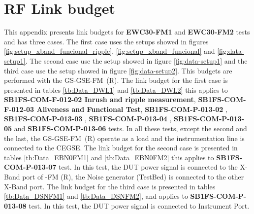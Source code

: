 \section{RF Link budget} \label{an:rf-link-budget}
\newcommand{\cod}{SB1FS-COM-}

 

This appendix presents link budgets for \textbf{EWC30-FM1} and \textbf{EWC30-FM2} 
tests and has three cases.
The first case uses the setups showed in figures \ref{fig:setup_xband_funcional_ripple}, \ref{fig:setup_xband_funcional} and \ref{fig:data-setup1}.
The second case use the setup showed in figure \ref{fig:data-setup1} and 
the third case use the setup showed in figure \ref{fig:data-setup2}. This budgets are performed with the 
GS-GSE-FM~(R). The link budget for the first case is presented in tables \ref{tb:Data_DWL1} and 
\ref{tb:Data_DWL2} this applies to \textbf{\cod{F-012-02} Inrush and ripple measurement}, \textbf{\cod{F-012-03} Aliveness and Functional Test}, 
\textbf{\cod{P-013-02} \TestPerfRFPXA}, \textbf{\cod{P-013-03} \TestPerfCCDF}, 
\textbf{\cod{P-013-04} \TestPerfFreqS}, \textbf{\cod{P-013-05} \TestPerfCWPhaseN} and 
\textbf{\cod{P-013-06} \TestPerfFilterVector} tests. In all these tests, except the second and the last,
 the GS-GSE-FM~(R) operate as a load and the instrumentation line is connected to the CEGSE. 
 The link budget for the second case is presented in tables \ref{tb:Data_EBN0FM1} and \ref{tb:Data_EBN0FM2} 
 this applies to \textbf{\cod{P-013-07} \TestPerfBer} test. 
In this test, the DUT power signal is connected to the X-Band port of \gse-FM (R), the Noise generator 
(TestBed) is connected to the other X-Band port. The link budget for the third case is 
presented in tables \ref{tb:Data_DSNFM1} and \ref{tb:Data_DSNFM2}, 
and applies to \textbf{\cod{P-013-08} \TestPerfSpuriousDSN}
test. In this test, the DUT power signal is connected to Instrument Port.\\
\vspace{0.5cm}

